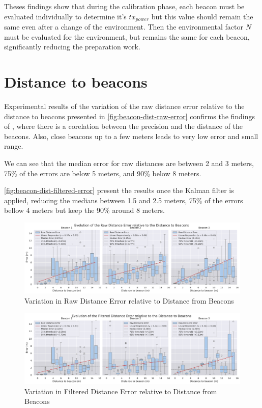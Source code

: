 Theses findings show that during the calibration phase, each beacon must be evaluated individually to determine it's $tx_{power}$ but this value should remain the same even after a change of the environment. Then the environmental factor $N$ must be evaluated for the environment, but remains the same for each beacon, significantly reducing the preparation work.

\section{Distance to beacons}

Experimental results of the variation of the raw distance error relative to the distance to beacons presented in \autoref{fig:beacon-dist-raw-error} confirms the findings of \cite{spachos_ble_2020}, where there is a corelation between the precision and the distance of the beacons. Also, close beacons up to a few meters leads to very low error and small range.

We can see that the median error for raw distances are between 2 and 3 meters, 75\% of the errors are below 5 meters, and 90\% below 8 meters.


 \autoref{fig:beacon-dist-filtered-error} present the results once the Kalman filter is applied, reducing the medians between 1.5 and 2.5 meters, 75\% of the errors bellow 4 meters but keep the 90\% around 8 meters. 

\begin{figure}[h]
    \centering
    \includegraphics[width=\linewidth]{assets/beacon-dist-raw-error-by-beacon.pdf}
    \caption{Variation in Raw Distance Error relative to Distance from Beacons}
    \label{fig:beacon-dist-raw-error}
\end{figure}

\begin{figure}[h]
    \centering
    \includegraphics[width=\linewidth]{assets/beacon-dist-filtered-error-by-beacon.pdf}
    \caption{Variation in Filtered Distance Error relative to Distance from Beacons}
    \label{fig:beacon-dist-filtered-error}
\end{figure}



